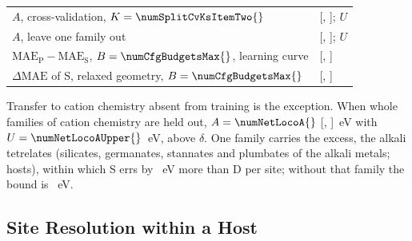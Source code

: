 \begin{table}[H]
\begin{tabularx}{\linewidth}{Xl}
$A$, cross-validation, $K = \numSplitCvKsItemTwo{}$ & \numNetCvTwentyA{} [\numNetCvTwentyALo{}, \numNetCvTwentyAHi{}]; $U$ \numNetCvTwentyAUpper{} \\
$A$, leave one family out & \numNetLocoA{} [\numNetLocoALo{}, \numNetLocoAHi{}]; $U$ \numNetLocoAUpper{} \\
$\mathrm{MAE}_\mathrm{P} - \mathrm{MAE}_\mathrm{S}$, $B = \numCfgBudgetsMax{}$, learning curve & \numNetStgSixHundredFiftyFourPMinusS{} [\numNetStgSixHundredFiftyFourPMinusSLo{}, \numNetStgSixHundredFiftyFourPMinusSHi{}] \\
$\Delta\mathrm{MAE}$ of S, relaxed geometry, $B = \numCfgBudgetsMax{}$ & \numNetGeomDeltaMaeSSixHundredFiftyFourRelaxed{} [\numNetGeomDeltaMaeSSixHundredFiftyFourRelaxedLo{}, \numNetGeomDeltaMaeSSixHundredFiftyFourRelaxedHi{}] \\
\bottomrule
\end{tabularx}
\end{table}

Transfer to cation chemistry absent from training is the exception. When whole families of cation chemistry are held out, $A = \numNetLocoA{}$ [\numNetLocoALo{}, \numNetLocoAHi{}]~eV with $U = \numNetLocoAUpper{}$~eV, above $\delta$. One family carries the excess, the alkali tetrelates (silicates, germanates, stannates and plumbates of the alkali metals; \numNetLocoAlkaliGroupFourteenHosts{} hosts), within which S errs by \numNetLocoAlkaliGroupFourteenAFamily{}~eV more than D per site; without that family the bound is \numNetLocoUpperWithoutAlkaliGroupFourteen{}~eV.

\subsection{Site Resolution within a Host}
\label{sec:within_host}

